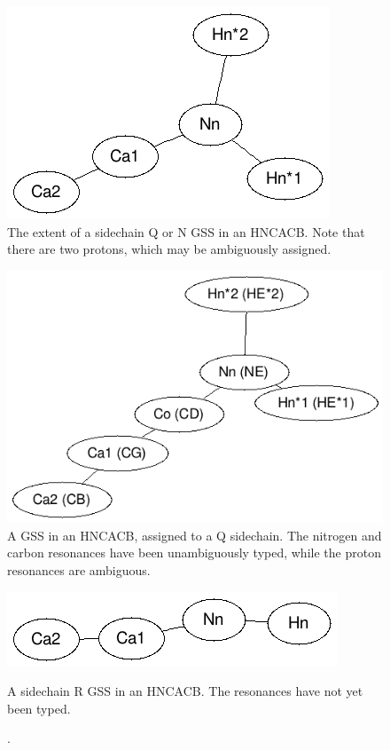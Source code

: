 \begin{figure}
  \includegraphics[scale=0.75]{figures/sidechain_qn_hncacb}
  \caption[The extent of a sidechain Q or N GSS in an HNCACB.]
          {The extent of a sidechain Q or N GSS in an HNCACB.  Note that
           there are two protons, which may be ambiguously assigned.}
  \label{sidechain_qn_hncacb}
\end{figure}

\begin{figure}
  \includegraphics[scale=0.75]{figures/sidechain_q_hncacb}
  \caption[A GSS in an HNCACB, assigned to a Q sidechain.]
          {A GSS in an HNCACB, assigned to a Q sidechain.
           The nitrogen and carbon resonances have been unambiguously
           typed, while the proton resonances are ambiguous.}
  \label{sidechain_q_hncacb}
\end{figure}

\begin{figure}
  \includegraphics[scale=0.75]{figures/sidechain_r_hncacb}
  \caption[A sidechain R gss in an HNCACB].
          {A sidechain R GSS in an HNCACB.  The resonances have not
           yet been typed.}
  \label{sidechain_r_hncacb}
\end{figure}

